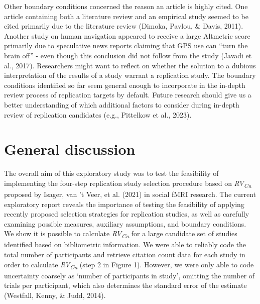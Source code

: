 \documentclass[
  man,floatsintext]{apa6}
\begin{document}
Other boundary conditions concerned the reason an article is highly cited. One article containing both a literature review and an empirical study seemed to be cited primarily due to the literature review (Dimoka, Pavlou, \& Davis, 2011). Another study on human navigation appeared to receive a large Altmetric score primarily due to speculative news reports claiming that GPS use can ``turn the brain off'' - even though this conclusion did not follow from the study (Javadi et al., 2017). Researchers might want to reflect on whether the solution to a dubious interpretation of the results of a study warrant a replication study. The boundary conditions identified so far seem general enough to incorporate in the in-depth review process of replication targets by default. Future research should give us a better understanding of which additional factors to consider during in-depth review of replication candidates (e.g., Pittelkow et al., 2023).

\hypertarget{general-discussion}{%
\section{General discussion}\label{general-discussion}}

The overall aim of this exploratory study was to test the feasibility of implementing the four-step replication study selection procedure based on \emph{RV\textsubscript{Cn}} proposed by Isager, van 't Veer, et al. (2021) in social fMRI research. The current exploratory report reveals the importance of testing the feasibility of applying recently proposed selection strategies for replication studies, as well as carefully examining possible measures, auxiliary assumptions, and boundary conditions. We show it is possible to calculate \emph{RV\textsubscript{Cn}} for a large candidate set of studies identified based on bibliometric information. We were able to reliably code the total number of participants and retrieve citation count data for each study in order to calculate \emph{RV\textsubscript{Cn}} (step 2 in Figure 1). However, we were only able to code uncertainty coarsely as `number of participants in study', omitting the number of trials per participant, which also determines the standard error of the estimate (Westfall, Kenny, \& Judd, 2014).
\end{document}
